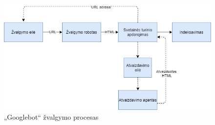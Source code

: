 \begin{figure}[htp!]
\centering
\includegraphics[scale=0.7]{img/Googlebot_rendering.png}
\caption{„Googlebot“ žvalgymo procesas \cite{GooglebotCrawling}}
\label{fig:googlebot_rendering}
\end{figure}